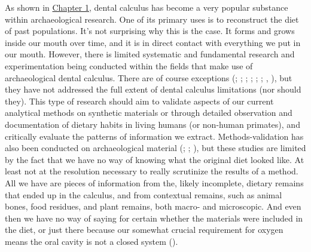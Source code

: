 \documentclass[
  b5paper,
]{book}
\begin{document}
As shown in \hyperref[fig-plot-and-wordclouds]{Chapter 1}, dental
calculus has become a very popular substance within archaeological
research. One of its primary uses is to reconstruct the diet of past
populations. It's not surprising why this is the case. It forms and
grows inside our mouth over time, and it is in direct contact with
everything we put in our mouth. However, there is limited systematic and
fundamental research and experimentation being conducted within the
fields that make use of archaeological dental calculus. There are of
course exceptions
(; ; ;
; ; ;
,
), but they have not
addressed the full extent of dental calculus limitations (nor should
they). This type of research should aim to validate aspects of our
current analytical methods on synthetic materials or through detailed
observation and documentation of dietary habits in living humans (or
non-human primates), and critically evaluate the patterns of information
we extract. Methods-validation has also been conducted on archaeological
material (; ; ), but
these studies are limited by the fact that we have no way of knowing
what the original diet looked like. At least not at the resolution
necessary to really scrutinize the results of a method. All we have are
pieces of information from the, likely incomplete, dietary remains that
ended up in the calculus, and from contextual remains, such as animal
bones, food residues, and plant remains, both macro- and microscopic.
And even then we have no way of saying for certain whether the materials
were included in the diet, or just there because our somewhat crucial
requirement for oxygen means the oral cavity is not a closed system
().
\end{document}
